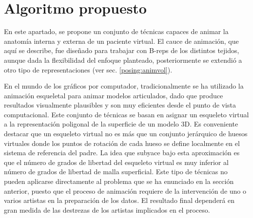 \section{Algoritmo propuesto}
\label{posing:method}
En este apartado, se propone un conjunto de técnicas capaces de animar la anatomía interna y externa de un paciente virtual. El cauce de animación, que aquí se describe, fue diseñado para trabajar con \acs{B-rep}s de los distintos tejidos, aunque dada la flexibilidad del enfoque planteado, posteriormente se extendió a otro tipo de representaciones (ver sec. \ref{posing:animvol}). 
%

En el mundo de los gráficos por computador, tradicionalmente se ha utilizado la animación esqueletal para animar modelos articulados, dado que produce resultados visualmente plausibles y son muy eficientes desde el punto de vista computacional. Este conjunto de técnicas se basan en asignar un esqueleto virtual a la representación poligonal de la superficie de un modelo 3D. Es conveniente destacar que un esqueleto virtual no es más que un conjunto jerárquico de huesos virtuales donde los puntos de rotación de cada hueso se define localmente en el sistema de referencia del padre. 
La idea que subyace bajo esta aproximación es que el número de grados de libertad del esqueleto virtual es muy inferior al número de grados de libertad de malla superficial. Este tipo de técnicas no pueden aplicarse directamente al problema que se ha enunciado en la sección anterior, puesto que el proceso de animación requiere de la intervención de uno o varios artistas en la preparación de los datos. El resultado final dependerá en gran medida de las destrezas de los artistas implicados en el proceso. 

